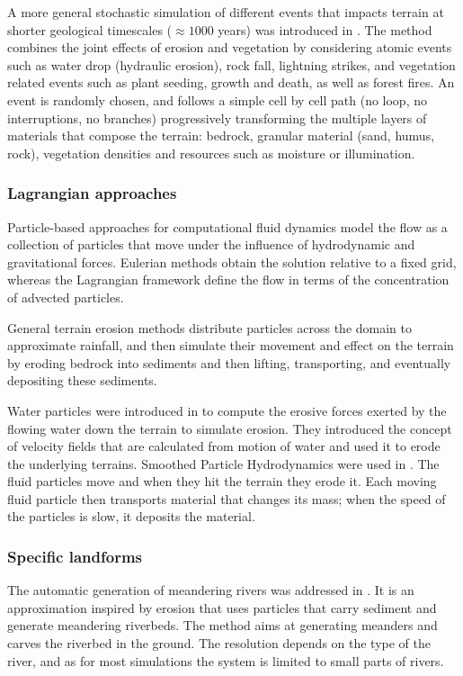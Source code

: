 \documentclass{article}
\begin{document}
A more general stochastic simulation of different events that impacts terrain at shorter geological timescales ($\approx 1000$ years) was introduced in \cite{CGG17}. The method combines the joint effects of erosion and vegetation by considering atomic events such as water drop (hydraulic erosion), rock fall, lightning strikes, and vegetation related events such as plant seeding, growth and death, as well as forest fires. An event is randomly chosen, and follows a simple cell by cell path (no loop, no interruptions, no branches) progressively transforming the multiple layers of materials that compose the terrain: bedrock, granular material (sand, humus, rock), vegetation densities and resources such as moisture or illumination.

\subsubsection{Lagrangian approaches}

Particle-based approaches for computational fluid dynamics model the flow as a collection of particles that move under the influence of hydrodynamic and gravitational forces. Eulerian methods obtain the solution relative to a fixed grid, whereas the Lagrangian framework define the flow in terms of the concentration of advected particles.

General terrain erosion methods distribute particles across the domain to approximate rainfall, and then simulate their movement and effect on the terrain by eroding bedrock into sediments and then lifting, transporting, and eventually depositing these sediments.

Water particles were introduced in \cite{CMF98} to compute the erosive forces exerted by the flowing water down the terrain to simulate erosion. They introduced the concept of velocity fields that are calculated from motion of water and used it to erode the underlying terrains. Smoothed Particle Hydrodynamics were used in \cite{KBKŠ09}. The fluid particles move and when they hit the terrain they erode it. Each moving fluid particle then transports material that changes its mass; when the speed of the particles is slow, it deposits the material.

\subsubsection{Specific landforms}

The automatic generation of meandering rivers was addressed in \cite{Kur12, Kur13}. It is an approximation inspired by erosion that uses particles that carry sediment and generate meandering riverbeds. The method aims at generating meanders and carves the riverbed in the ground. The resolution depends on the type of the river, and as for most simulations the system is limited to small parts of rivers.
\end{document}
